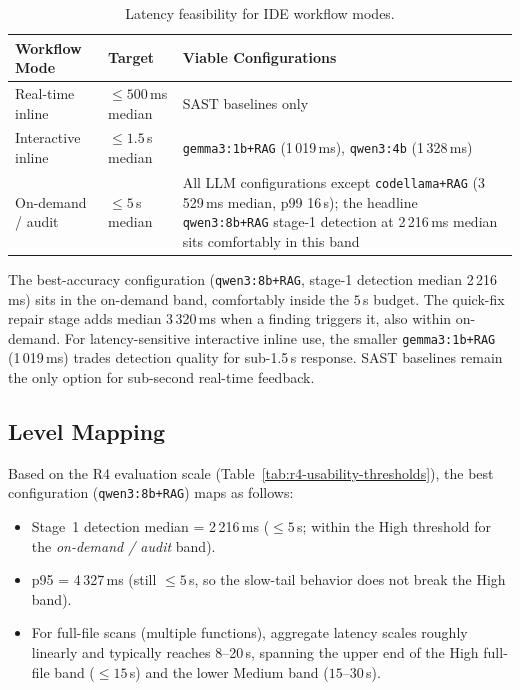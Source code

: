 \begin{table}[H]
\centering
\caption{Latency feasibility for IDE workflow modes.}
\label{tab:r4-feasibility}
\footnotesize
\begin{tabularx}{\textwidth}{@{}llX@{}}
\toprule
\textbf{Workflow Mode} & \textbf{Target} & \textbf{Viable Configurations} \\
\midrule
Real-time inline    & $\leq 500$\,ms median & SAST baselines only \\
Interactive inline  & $\leq 1.5$\,s median  & \texttt{gemma3:1b+RAG} (1\,019\,ms), \texttt{qwen3:4b} (1\,328\,ms) \\
On-demand / audit   & $\leq 5$\,s median    & All LLM configurations except \texttt{codellama+RAG} (3\,529\,ms median, p99 16\,s); the headline \texttt{qwen3:8b+RAG} stage-1 detection at 2\,216\,ms median sits comfortably in this band \\
\bottomrule
\end{tabularx}
\end{table}

The best-accuracy configuration (\texttt{qwen3:8b+RAG}, stage-1 detection median 2\,216\,ms) sits in the on-demand band, comfortably inside the $5$\,s budget. The quick-fix repair stage adds median 3\,320\,ms when a finding triggers it, also within on-demand. For latency-sensitive interactive inline use, the smaller \texttt{gemma3:1b+RAG} (1\,019\,ms) trades detection quality for sub-1.5\,s response. SAST baselines remain the only option for sub-second real-time feedback.

\subsection{Level Mapping}

Based on the R4 evaluation scale (Table~\ref{tab:r4-usability-thresholds}), the best configuration (\texttt{qwen3:8b+RAG}) maps as follows:

\begin{itemize}
  \item Stage~1 detection median = 2\,216\,ms ($\leq 5$\,s; within the High threshold for the \emph{on-demand / audit} band).
  \item p95 = 4\,327\,ms (still $\leq 5$\,s, so the slow-tail behavior does not break the High band).
  \item For full-file scans (multiple functions), aggregate latency scales roughly linearly and typically reaches 8--20\,s, spanning the upper end of the High full-file band ($\leq 15$\,s) and the lower Medium band ($15$--$30$\,s).
\end{itemize}

